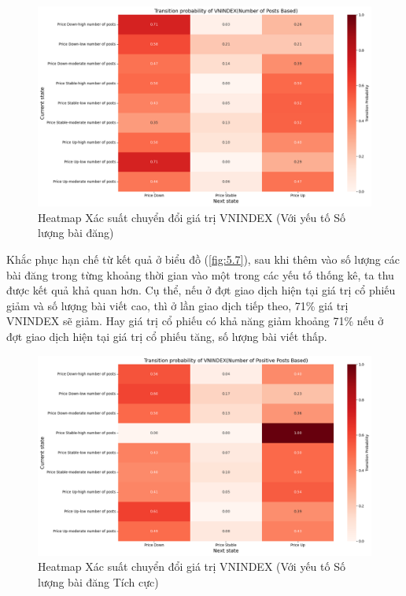 \begin{figure}[H]
    \centering
    \includegraphics[width=0.95\linewidth]{images/C2_pic11.png}
    \caption{Heatmap Xác suất chuyển đổi giá trị VNINDEX (Với yếu tố Số lượng bài đăng)}
    \label{fig:5.8}
\end{figure}

Khắc phục hạn chế từ kết quả ở biểu đồ (\ref{fig:5.7}), sau khi thêm vào số lượng các bài đăng trong từng khoảng thời gian vào một trong các yếu tố thống kê, ta thu được kết quả khả quan hơn. Cụ thể, nếu ở đợt giao dịch hiện tại giá trị cổ phiếu giảm và số lượng bài viết cao, thì ở lần giao dịch tiếp theo, 71\% giá trị VNINDEX sẽ giảm. Hay giá trị cổ phiếu có khả năng giảm khoảng 71\% nếu ở đợt giao dịch hiện tại giá trị cổ phiếu tăng, số lượng bài viết thấp.

\begin{figure}[H]
    \centering
    \includegraphics[width=0.95\linewidth]{images/C2_pic12.png}
    \vspace{-1em}
    \caption{Heatmap Xác suất chuyển đổi giá trị VNINDEX (Với yếu tố Số lượng bài đăng Tích cực)}
    \label{fig:5.9}
\end{figure}

